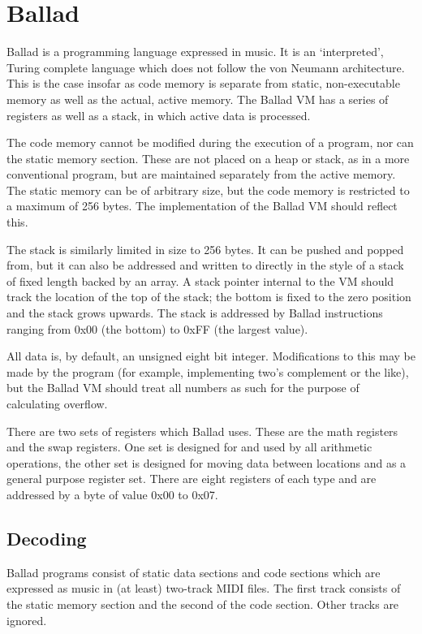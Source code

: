 

\section{Ballad} Ballad is a programming language expressed in music. It is an
`interpreted', Turing complete language which does not follow the von Neumann
architecture.  This is the case insofar as code memory is separate from static,
non-executable memory as well as the actual, active memory. The Ballad VM has a
series of registers as well as a stack, in which active data is processed. 

The code memory cannot be modified during the execution of a program, nor can
the static memory section. These are not placed on a heap or stack, as in a
more conventional program, but are maintained separately from the active
memory. The static memory can be of arbitrary size, but the code memory is
restricted to a maximum of 256 bytes. The implementation of the Ballad VM
should reflect this.

The stack is similarly limited in size to 256 bytes. It can be pushed and
popped from, but it can also be addressed and written to directly in the style
of a stack of fixed length backed by an array. A stack pointer internal to the
VM should track the location of the top of the stack; the bottom is fixed to
the zero position and the stack grows upwards. The stack is addressed by Ballad
instructions ranging from 0x00 (the bottom) to 0xFF (the largest value).

All data is, by default, an unsigned eight bit integer. Modifications to this
may be made by the program (for example, implementing two's complement or the
like), but the Ballad VM should treat all numbers as such for the purpose of
calculating overflow.

There are two sets of registers which Ballad uses. These are the math registers
and the swap registers. One set is designed for and used by all arithmetic
operations, the other set is designed for moving data between locations and as
a general purpose register set. There are eight registers of each type and are
addressed by a byte of value 0x00 to 0x07. 

\subsection{Decoding} Ballad programs consist of static data sections and code
sections which are expressed as music in (at least) two-track MIDI files. The
first track consists of the static memory section and the second of the code
section. Other tracks are ignored. 

